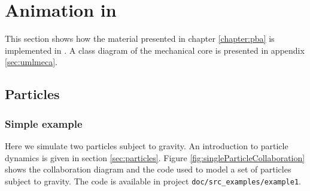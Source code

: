\chapter{Animation in \sofa}\label{chapter:as}
This section shows how the material presented in chapter \ref{chapter:pba} is implemented in \sofa. A class diagram of the mechanical core is presented in appendix \ref{sec:umlmeca}.
\section{Particles}
\subsection{Simple example}
Here we simulate two particles subject to gravity. An introduction to particle dynamics is given in section \ref{sec:particles}. 
Figure \ref{fig:singleParticleCollaboration} shows the collaboration diagram and the code used to model a set of particles subject to gravity. The code is available in project {\tt doc/src\_examples/example1}.


